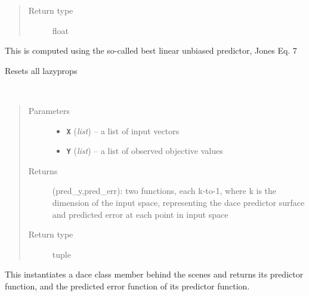 \documentclass[letterpaper,10pt,english]{sphinxmanual}
\begin{document}
\begin{fulllineitems}
\begin{fulllineitems}
\begin{quote}
\begin{description}
\item[{Return type}] \leavevmode
float

\end{description}\end{quote}

This is computed using the so-called best linear unbiased predictor,  Jones Eq. 7

\end{fulllineitems}


\begin{fulllineitems}
\label{index:smbo.models.dace.reset}
Resets all lazyprops

\end{fulllineitems}


\end{fulllineitems}


\begin{fulllineitems}
\label{index:smbo.models.dace_function}~\begin{quote}\begin{description}
\item[{Parameters}] \leavevmode\begin{itemize}
\item {} 
\textbf{\texttt{X}} (\emph{list}) -- a list of input vectors

\item {} 
\textbf{\texttt{Y}} (\emph{list}) -- a list of observed objective values

\end{itemize}

\item[{Returns}] \leavevmode
(pred\_y,pred\_err): two functions, each k-to-1, where k is the dimension of the input space, representing the dace predictor surface and predicted error at each point in input space

\item[{Return type}] \leavevmode
tuple

\end{description}\end{quote}

This instantiates a dace class member behind the scenes and returns its predictor function, and the predicted error function of its predictor function.

\end{fulllineitems}
\end{document}
